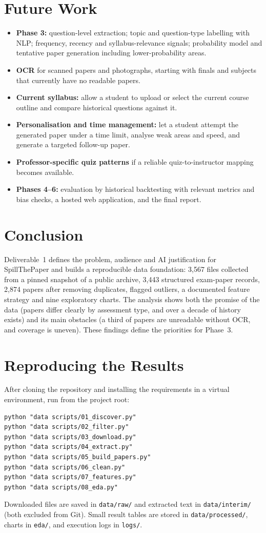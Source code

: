 \documentclass[11pt,a4paper]{article}
\newcommand{\file}[1]{\texttt{#1}}
\begin{document}
\section{Future Work}
\begin{itemize}
  \item \textbf{Phase 3:} question-level extraction; topic and question-type labelling with NLP; frequency, recency and syllabus-relevance signals; probability model and tentative paper generation including lower-probability areas.
  \item \textbf{OCR} for scanned papers and photographs, starting with finals and subjects that currently have no readable papers.
  \item \textbf{Current syllabus:} allow a student to upload or select the current course outline and compare historical questions against it.
  \item \textbf{Personalisation and time management:} let a student attempt the generated paper under a time limit, analyse weak areas and speed, and generate a targeted follow-up paper.
  \item \textbf{Professor-specific quiz patterns} if a reliable quiz-to-instructor mapping becomes available.
  \item \textbf{Phases 4--6:} evaluation by historical backtesting with relevant metrics and bias checks, a hosted web application, and the final report.
\end{itemize}

\section{Conclusion}
Deliverable~1 defines the problem, audience and AI justification for SpillThePaper and builds a reproducible data foundation: 3{,}567 files collected from a pinned snapshot of a public archive, 3{,}443 structured exam-paper records, 2{,}874 papers after removing duplicates, flagged outliers, a documented feature strategy and nine exploratory charts. The analysis shows both the promise of the data (papers differ clearly by assessment type, and over a decade of history exists) and its main obstacles (a third of papers are unreadable without OCR, and coverage is uneven). These findings define the priorities for Phase~3.

\appendix
\section{Reproducing the Results}
After cloning the repository and installing the requirements in a virtual environment, run from the project root:
\begin{verbatim}
python "data scripts/01_discover.py"
python "data scripts/02_filter.py"
python "data scripts/03_download.py"
python "data scripts/04_extract.py"
python "data scripts/05_build_papers.py"
python "data scripts/06_clean.py"
python "data scripts/07_features.py"
python "data scripts/08_eda.py"
\end{verbatim}
Downloaded files are saved in \file{data/raw/} and extracted text in \file{data/interim/} (both excluded from Git). Small result tables are stored in \file{data/processed/}, charts in \file{eda/}, and execution logs in \file{logs/}.
\end{document}
